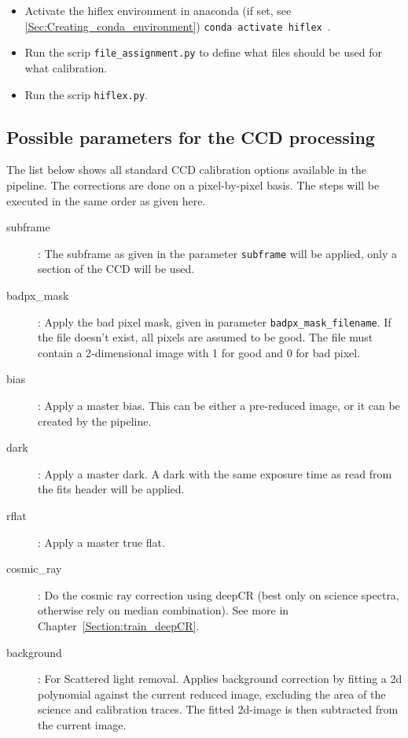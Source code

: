 \documentclass[10pt,a4paper]{article}
\begin{document}
\begin{itemize}
  \item Activate the hiflex environment in anaconda (if set, see \ref{Sec:Creating_conda_environment}) \verb|conda activate hiflex|~.
    
  \item Run the scrip \verb|file_assignment.py| to define what files should be used for what calibration.
    
  \item Run the scrip \verb|hiflex.py|.

\end{itemize}


\subsection{Possible parameters for the CCD processing}
\label{Section:parameters_CCD_proc}
\noindent The list below shows all standard CCD calibration options available in the pipeline. The corrections are done on a pixel-by-pixel basis. The steps will be executed in the same order as given here.
\begin{description}
  \item[subframe] : The subframe as given in the parameter \verb|subframe| will be applied, only a section of the CCD will be used.
  \item[badpx\_mask] : Apply the bad pixel mask, given in parameter \verb|badpx_mask_filename|. If the file doesn't exist, all pixels are assumed to be good. The file must contain a 2-dimensional image with 1 for good and 0 for bad pixel.
  \item[bias] : Apply a master bias. This can be either a pre-reduced image, or it can be created by the pipeline. %
  \item[dark] : Apply a master dark. A dark with the same exposure time as read from the fits header will be applied. %
  \item[rflat] : Apply a master true flat. %
  \item[cosmic\_ray] : Do the cosmic ray correction using deepCR (best only on science spectra, otherwise rely on median combination). See more in Chapter~\ref{Section:train_deepCR}.
  \item[background] : For Scattered light removal. Applies background correction by fitting a 2d polynomial against the current reduced image, excluding the area of the science and calibration traces. The fitted 2d-image is then subtracted from the current image.
\end{description}
\end{document}
